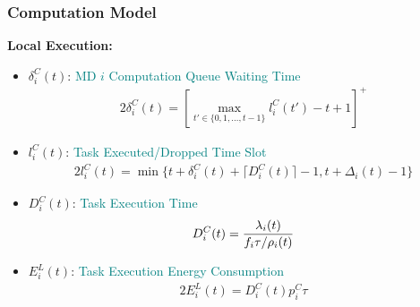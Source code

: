 \begin{frame}
	\frametitle{Computation Model}
	\textbf{Local Execution:}
	
	\vspace{2mm}
	
	\begin{itemize}[]
		
		\item $\delta_i^{C}(t)$:  \textcolor{teal}{MD $i$ Computation Queue Waiting Time}%
		\vspace{-3mm}
		\begin{alignat}{2}
			\delta_i^{C}(t) = \left[ \max \limits_{t' \in \{0,1,\ldots,t-1\}} l_i^{C}(t')-t+1 \right]^+
			\label{5}  
		\end{alignat}
		
		
		\item $l_i^{C}(t)$: \textcolor{teal}{Task Executed/Dropped Time Slot}
		\begin{alignat}{2}
			l_i^{C}(t) = \min \Big\{t + \delta_i^{C}(t) + \lceil D_i^{C}(t) \rceil - 1, t + \Delta_i(t) - 1\Big\}
			\label{6}  
		\end{alignat}
		
		
		\item $D_i^{C}(t)$:	\textcolor{teal}{Task Execution Time}
		\vspace{-4mm}
		\begin{alignat}{2}
			D_i^{C}(t) = { \lambda_i(t)  \over  f_i  \tau /  \rho_i(t)}
			\label{7}  
		\end{alignat}
		
		
		
		\item $E_i^{L}(t)$:	\textcolor{teal}{Task Execution Energy Consumption}
		\vspace{-1mm}
		\begin{alignat}{2}
			E_i^{L}(t) =  D_i^{C}(t) p_i^{C}  \tau %
			\label{8}  
		\end{alignat}
		
		
	\end{itemize}
\end{frame}



